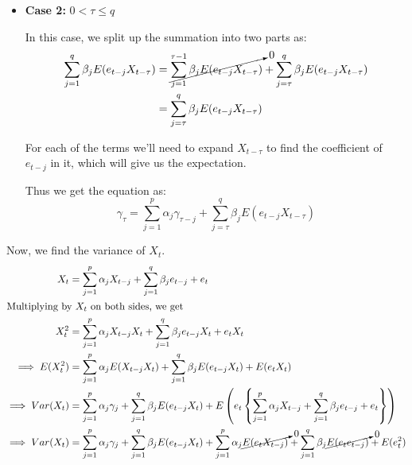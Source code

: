 \documentclass[12pt, oneside]{article}
\begin{document}
\begin{enumerate}
{\begin{itemize}
        Here, \(j < \tau \implies t - j > t - \tau\) for all \(j = 1, \ldots, q\). This implies, by our previous observation,
        that \(E(e_{t-j} X_{t-\tau}) = 0\) for all \(j = 1,\ldots,q\)

        Thus the equation simplifies to:
        \begin{equation}
            \gamma_{\tau} = \sum_{j=1}^{p}\alpha_j \gamma_{\tau - j} \label{eq:q6:case1}
        \end{equation}

        \item \textbf{Case 2: } \(0 < \tau \leq q\)
        
        In this case, we split up the summation into two parts as:
        \begin{align*}
            \sum_{j=1}^{q} \beta_j E(e_{t-j} X_{t-\tau}) &= \cancelto{0}{\sum_{j=1}^{\tau - 1} \beta_j E(e_{t-j} X_{t-\tau})} + \sum_{j=\tau}^{q} \beta_j E(e_{t-j} X_{t-\tau}) \\
                &= \sum_{j=\tau}^{q} \beta_j E(e_{t-j} X_{t-\tau})
        \end{align*}

        For each of the terms we'll need to expand \(X_{t-\tau}\) to find the coefficient
        of \(e_{t-j}\) in it, which will give us the expectation.

        Thus we get the equation as:
        \begin{equation}
            \gamma_{\tau} = \sum_{j=1}^{p}\alpha_j \gamma_{\tau - j} + \sum_{j=\tau}^{q} \beta_j E(e_{t-j} X_{t-\tau})
                \label{eq:q6:case2}
        \end{equation}
    \end{itemize}

    Now, we find the variance of \(X_t\).
    \begin{align*}
        X_t &= \sum_{j=1}^{p}\alpha_j X_{t-j} + \sum_{j=1}^{q} \beta_j e_{t-j} + e_t \\
        \intertext{Multiplying by \(X_t\) on both sides, we get}
        X_t^2 &= \sum_{j=1}^{p}\alpha_j X_{t-j} X_t + \sum_{j=1}^{q} \beta_j e_{t-j} X_t + e_t X_t \\
        \implies E(X_t^2) &= \sum_{j=1}^{p}\alpha_j E(X_{t-j} X_t) + \sum_{j=1}^{q} \beta_j E(e_{t-j} X_t) + E(e_t X_t) \\
        \implies Var(X_t) &= \sum_{j=1}^{p}\alpha_j \gamma_j + \sum_{j=1}^{q} \beta_j E(e_{t-j} X_t) + E\left(e_t \left\{\sum_{j=1}^{p}\alpha_j X_{t-j} + \sum_{j=1}^{q} \beta_j e_{t-j} + e_t\right\}\right) \\
        \implies Var(X_t) &= \sum_{j=1}^{p}\alpha_j \gamma_j + \sum_{j=1}^{q} \beta_j E(e_{t-j} X_t) + \sum_{j=1}^{p}\alpha_j \cancelto{0}{E(e_t X_{t-j})} + \sum_{j=1}^{q} \beta_j \cancelto{0}{E(e_t e_{t-j})} + E(e_t^2)
    \end{align*}
    
}
\end{enumerate}
\end{document}
